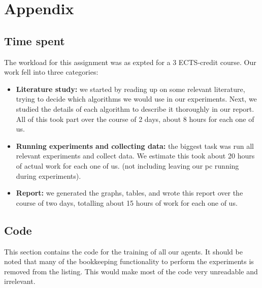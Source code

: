 \documentclass[10pt,a4paper]{article}
\begin{document}







\newpage
\section*{Appendix}
\subsection{Time spent}
The workload for this assignment was as expted for a 3 ECTS-credit course. Our work fell into three categories:
\begin{itemize}
\item{\textbf{Literature study: } we started by reading up on some relevant literature, trying to decide which algorithms we would use in our experiments. Next, we studied the details of each algorithm to describe it thoroughly in our report. All of this took part over the course of 2 days, about 8 hours for each one of us.}
\item{\textbf{Running experiments and collecting data: } the biggest task was run all relevant experiments and collect data. We estimate this took about 20 hours of actual work for each one of us. (not including leaving our pc running during experiments).}
\item{\textbf{Report: } we generated the graphs, tables, and wrote this report over the course of two days, totalling about 15 hours of work for each one of us.}
\end{itemize}
\newpage
\subsection{Code}
This section contains the code for the training of all our agents.
It should be noted that many of the bookkeeping functionality to perform the experiments is removed from the listing. This would make most of the code very unreadable and irrelevant.
\end{document}
